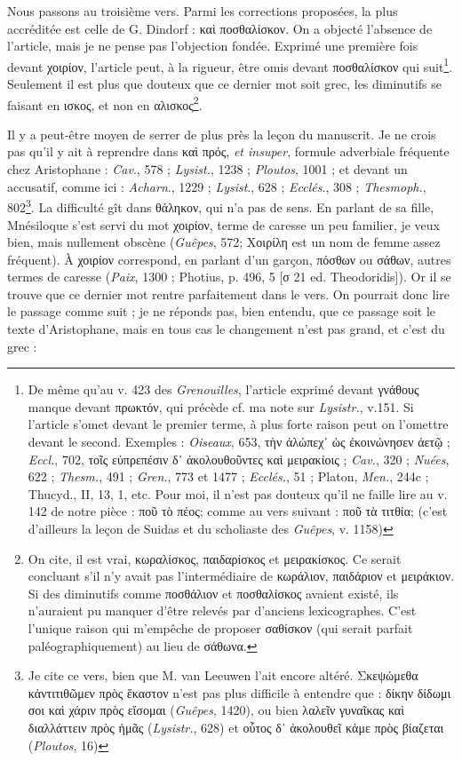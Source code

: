 \documentclass{book}%
\newcommand{\italique}[1]{\textit{#1}}%
\newcommand{\note}[1]{\footnote{#1}}
\begin{document}
Nous passons au troisième vers. Parmi les corrections proposées, la plus accréditée est celle de G. Dindorf : καὶ ποσθαλίσκον. On a objecté l'absence de l'article, mais je ne pense pas l'objection fondée. Exprimé une première fois devant χοιρίον, l'article peut, à la rigueur, être omis devant ποσθαλίσκον qui suit\note{De même qu'au v. 423 des \italique{Grenouilles}, l'article exprimé devant γνάθους manque devant πρωκτόν, qui précède cf. ma note sur \italique{Lysistr.}, v.151. Si l'article s'omet devant le premier terme, à plus forte raison peut on l'omettre devant le second. Exemples : \italique{Oiseaux}, 653, τὴν ἀλώπεχ᾽ ὡς ἐκοινώνησεν ἀετῷ ; \italique{Eccl.}, 702, τοῖς εὐπρεπέσιν δ᾽ ἀκολουθοῦντες καὶ μειρακίοις ; \italique{Cav.}, 320 ; \italique{Nuées}, 622 ; \italique{Thesm.}, 491 ; \italique{Gren.}, 773 et 1477 ; \italique{Ecclés.}, 51 ; Platon, \italique{Men.}, 244c ; Thucyd., II, 13, 1, etc. Pour moi, il n'est pas douteux qu'il ne faille lire au v. 142 de notre pièce : ποῦ τὸ πέος; comme au vers suivant : ποῦ τὰ τιτθία; (c'est d'ailleurs la leçon de Suidas et du scholiaste des \italique{Guêpes}, v. 1158)}. Seulement il est plus que douteux que ce dernier mot soit grec, les diminutifs se faisant en ισκος, et non en αλισκος\note{On cite, il est vrai, κωραλίσκος, παιδαρίσκος et μειρακίσκος. Ce serait concluant s'il n'y avait pas l'intermédiaire de κωράλιον, παιδάριον et μειράκιον. Si des diminutifs comme ποσθάλιον et ποσθαλίσκος avaient existé, ils n'auraient pu manquer d'être relevés par d'anciens lexicographes. C'est l'unique raison qui m'empêche de proposer σαθίσκον (qui serait parfait paléographiquement) au lieu de σάθωνα.}. 

Il y a peut-être moyen de serrer de plus près la leçon du manuscrit. Je ne crois pas qu'il y ait à reprendre dans καὶ πρός, \italique{et insuper}, formule adverbiale fréquente chez Aristophane : \italique{Cav}., 578 ; \italique{Lysist.}, 1238 ; \italique{Ploutos}, 1001 ; et devant un accusatif, comme ici : \italique{Acharn}., 1229 ; \italique{Lysist}., 628 ; \italique{Ecclés}., 308 ; \italique{Thesmoph.}, 802\note{Je cite ce vers, bien que M. van Leeuwen l'ait encore altéré. Σκεψώμεθα κἀντιτιθῶμεν πρὸς ἕκαστον n'est pas plus difficile à entendre que : δίκην δίδωμι σοι καὶ χάριν πρὸς εἴσομαι (\italique{Guêpes}, 1420), ou bien λαλεῖν γυναῖκας καὶ διαλλάττειν πρὸς ἡμᾶς (\italique{Lysistr.}, 628) et οὗτος δ᾽ ἀκολουθεῖ κἀμε πρὸς βίαζεται (\italique{Ploutos}, 16)}. 
La difficulté gît dans θάληκον, qui n'a pas de sens. En parlant de sa fille, Mnésiloque s'est servi du mot χοιρίον, terme de caresse un peu familier, je veux bien, mais nullement obscène (\italique{Guêpes}, 572; Χοιρίλη est un nom de femme assez fréquent). 
À χοιρίον correspond, en parlant d'un garçon, πόσθων ou σάθων, autres termes de caresse (\italique{Paix}, 1300 ; Photius, p. 496, 5 [σ 21 ed. Theodoridis]). Or il se trouve que ce dernier mot rentre parfaitement dans le vers. On pourrait donc lire le passage comme suit ; je ne réponds pas, bien entendu, que ce passage soit le texte d'Aristophane, mais en tous cas le changement n'est pas grand, et c'est du grec :\\
\end{document}
